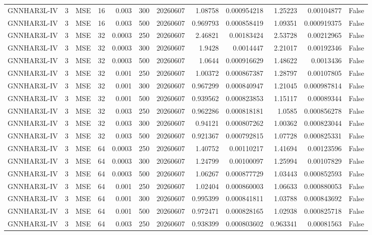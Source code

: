 \begin{tabular}{lrlrrrrrrrrr}
GNNHAR3L-IV & 3 & MSE & 16 & 0.003 & 300 & 20260607 & 1.08758 & 0.000954218 & 1.25223 & 0.00104877 & False \\
GNNHAR3L-IV & 3 & MSE & 16 & 0.003 & 500 & 20260607 & 0.969793 & 0.000858419 & 1.09351 & 0.000919375 & False \\
GNNHAR3L-IV & 3 & MSE & 32 & 0.0003 & 250 & 20260607 & 2.46821 & 0.00183424 & 2.53728 & 0.00212965 & False \\
GNNHAR3L-IV & 3 & MSE & 32 & 0.0003 & 300 & 20260607 & 1.9428 & 0.0014447 & 2.21017 & 0.00192346 & False \\
GNNHAR3L-IV & 3 & MSE & 32 & 0.0003 & 500 & 20260607 & 1.0644 & 0.000916629 & 1.48622 & 0.0013436 & False \\
GNNHAR3L-IV & 3 & MSE & 32 & 0.001 & 250 & 20260607 & 1.00372 & 0.000867387 & 1.28797 & 0.00107805 & False \\
GNNHAR3L-IV & 3 & MSE & 32 & 0.001 & 300 & 20260607 & 0.967299 & 0.000840947 & 1.21045 & 0.000987814 & False \\
GNNHAR3L-IV & 3 & MSE & 32 & 0.001 & 500 & 20260607 & 0.939562 & 0.000823853 & 1.15117 & 0.00089344 & False \\
GNNHAR3L-IV & 3 & MSE & 32 & 0.003 & 250 & 20260607 & 0.962286 & 0.000818181 & 1.0585 & 0.000856278 & False \\
GNNHAR3L-IV & 3 & MSE & 32 & 0.003 & 300 & 20260607 & 0.94121 & 0.000807262 & 1.00362 & 0.000823044 & False \\
GNNHAR3L-IV & 3 & MSE & 32 & 0.003 & 500 & 20260607 & 0.921367 & 0.000792815 & 1.07728 & 0.000825331 & False \\
GNNHAR3L-IV & 3 & MSE & 64 & 0.0003 & 250 & 20260607 & 1.40752 & 0.00110217 & 1.41694 & 0.00123596 & False \\
GNNHAR3L-IV & 3 & MSE & 64 & 0.0003 & 300 & 20260607 & 1.24799 & 0.00100097 & 1.25994 & 0.00107829 & False \\
GNNHAR3L-IV & 3 & MSE & 64 & 0.0003 & 500 & 20260607 & 1.06267 & 0.000877729 & 1.03443 & 0.000852593 & False \\
GNNHAR3L-IV & 3 & MSE & 64 & 0.001 & 250 & 20260607 & 1.02404 & 0.000860003 & 1.06633 & 0.000880053 & False \\
GNNHAR3L-IV & 3 & MSE & 64 & 0.001 & 300 & 20260607 & 0.995399 & 0.000841811 & 1.03788 & 0.000843692 & False \\
GNNHAR3L-IV & 3 & MSE & 64 & 0.001 & 500 & 20260607 & 0.972471 & 0.000828165 & 1.02938 & 0.000825718 & False \\
GNNHAR3L-IV & 3 & MSE & 64 & 0.003 & 250 & 20260607 & 0.938399 & 0.000803602 & 0.963341 & 0.00081563 & False \\

\end{tabular}
